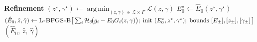 \begin{algorithm}[H]
\begin{algorithmic}[1]
\Statex \textbf{Refinement}
\State $(z^{\star}, \gamma^{\star}) \gets
    \displaystyle\operatorname*{arg\,min}_{(z,\gamma) \,\in\, \mathcal{Z} \times \Gamma}
    \mathcal{L}(z, \gamma)$
\State $E_0^{\star} \gets \hat{E}_0(z^{\star}, \gamma^{\star})$
\State $(\hat{E}_0, \hat{z}, \hat{\gamma}) \gets
    \textsc{L-BFGS-B}\!\left[\,
    \sum_i \mathcal{H}_\delta\!\big( g_i - E_0 G_i(z,\gamma) \big);\;
    \text{init } (E_0^{\star}, z^{\star}, \gamma^{\star});\;
    \text{bounds } [E_\pm],[z_\pm],[\gamma_\pm] \,\right]$
\Statex
\State \Return $(\hat{E}_0,\, \hat{z},\, \hat{\gamma})$
 
\end{algorithmic}
\end{algorithm}




